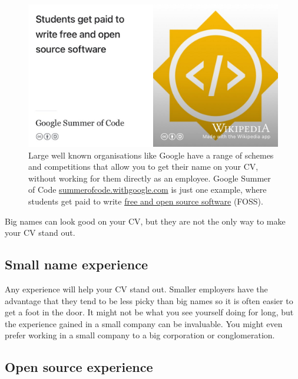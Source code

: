 \documentclass[
]{book}
\begin{document}
\begin{figure}

{\centering \includegraphics[width=1\linewidth]{images/gsoc} 

}

\caption{Large well known organisations like Google have a range of schemes and competitions that allow you to get their name on your CV, without working for them directly as an employee. Google Summer of Code \href{https://summerofcode.withgoogle.com/}{summerofcode.withgoogle.com} is just one example, where students get paid to write \href{https://en.wikipedia.org/wiki/Free_and_open-source_software}{free and open source software} (FOSS). \citep{gsoc}}\label{fig:gsoc-fig}
\end{figure}



Big names can look good on your CV, but they are not the only way to make your CV stand out.

\hypertarget{smallnames}{%
\subsection{Small name experience}\label{smallnames}}

Any experience will help your CV stand out. Smaller employers have the advantage that they tend to be less picky than big names so it is often easier to get a foot in the door. It might not be what you see yourself doing for long, but the experience gained in a small company can be invaluable. You might even prefer working in a small company to a big corporation or conglomeration.

\hypertarget{opensource}{%
\subsection{Open source experience}\label{opensource}}
\end{document}
